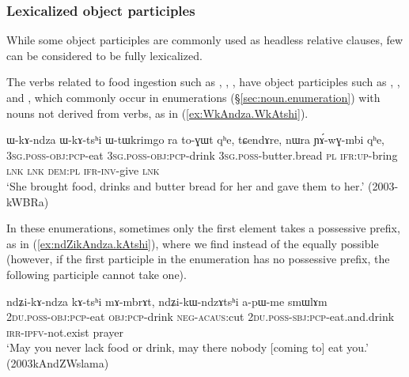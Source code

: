 \subsubsection{Lexicalized object participles} \label{sec:lexicalized.object.participle}
While some object participles are commonly used as headless relative clauses, few can be considered to be fully lexicalized. 

The verbs related to food ingestion such as , , ,  have object participles such as , ,  and , which commonly occur in enumerations (§\ref{sec:noun.enumeration}) with nouns not derived from verbs, as in (\ref{ex:WkAndza.WkAtshi}).  

\begin{exe}
\ex \label{ex:WkAndza.WkAtshi}
\gll  ɯ-kɤ-ndza ɯ-kɤ-tsʰi ɯ-tɯkrimgo ra to-ɣɯt qʰe, tɕendɤre, nɯra ɲɤ́-wɣ-mbi qʰe, \\
\textsc{3sg}.\textsc{poss}-\textsc{obj}:\textsc{pcp}-eat \textsc{3sg}.\textsc{poss}-\textsc{obj}:\textsc{pcp}-drink \textsc{3sg}.\textsc{poss}-butter.bread \textsc{pl} \textsc{ifr}:\textsc{up}-bring \textsc{lnk} \textsc{lnk} \textsc{dem}:\textsc{pl} \textsc{ifr}-\textsc{inv}-give \textsc{lnk} \\
 \glt  `She brought food, drinks and butter bread for her and gave them to her.' (2003-kWBRa)
\end{exe}

In these enumerations, sometimes only the first element takes a possessive prefix, as in (\ref{ex:ndZikAndza.kAtshi}), where we find  instead of the equally possible  (however, if the first  participle in the enumeration has no possessive prefix, the following participle cannot take one).

\begin{exe}
\ex \label{ex:ndZikAndza.kAtshi}
\gll  ndʑi-kɤ-ndza kɤ-tsʰi mɤ-mbrɤt, ndʑi-kɯ-ndzɤtsʰi a-pɯ-me smɯlɤm \\
\textsc{2du}.\textsc{poss}-\textsc{obj}:\textsc{pcp}-eat \textsc{obj}:\textsc{pcp}-drink \textsc{neg}-\textsc{acaus}:cut  \textsc{2du}.\textsc{poss}-\textsc{sbj}:\textsc{pcp}-eat.and.drink \textsc{irr}-\textsc{ipfv}-not.exist prayer \\
\glt `May you never lack food or drink, may there nobody [coming to] eat you.' (2003kAndZWslama)
\end{exe}

